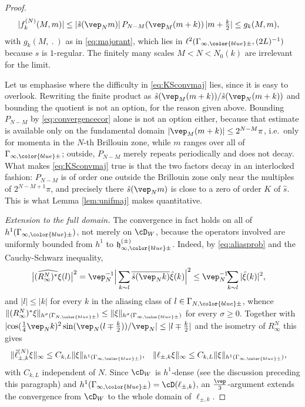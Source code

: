 \documentclass[a4paper, 11pt]{article}
\newcommand{\fh}{\mathfrak{h}}
\newcommand{\ltwo}{\ell^{2}}
\DeclareMathOperator{\1}{\mathds{1}}
\begin{document}
\begin{proof}
\begin{align}
\label{eq:KSconvmaj}
|f^{(N)}_{k}(M,m)| & \leq |\hat{s}(\vep_{N}m)|\!\ P_{N-M}(\vep_{M}(m+k))\!\ |m+\tfrac{k}{2}| \leq g_{k}(M,m),
\end{align}
with $g_{k}(M,\!\ .\!\ )$ as in \eqref{eq:majorant}, which lies in $\ltwo(\Gamma_{\infty,{\color{blue}\pm}},(2L)^{-1})$ because $s$ is $1$-regular. The finitely many scales $M<N<N_{0}(k)$ are irrelevant for the limit.

Let us emphasise where the difficulty in \eqref{eq:KSconvmaj} lies, since it is easy to overlook. Rewriting the finite product as $\hat{s}(\vep_{M}(m+k))/\hat{s}(\vep_{N}(m+k))$ and bounding the quotient is not an option, for the reason given above. Bounding $P_{N-M}$ by \eqref{eq:convergencecor} alone is not an option either, because that estimate is available only on the fundamental domain $|\vep_{M}(m+k)|\leq2^{N-M}\pi$, i.e.~only for momenta in the $N$-th Brillouin zone, while $m$ ranges over all of $\Gamma_{\infty,{\color{blue}\pm}}$; outside, $P_{N-M}$ merely repeats periodically and does not decay. What makes \eqref{eq:KSconvmaj} true is that the two factors decay in an interlocked fashion: $P_{N-M}$ is of order one outside the Brillouin zone only near the multiples of $2^{N-M+1}\pi$, and precisely there $\hat{s}(\vep_{N}m)$ is close to a zero of order $K$ of $\hat{s}$. This is what Lemma \ref{lem:unifmaj} makes quantitative.

\emph{Extension to the full domain.} The convergence in fact holds on all of $h^{1}(\Gamma_{\infty,{\color{blue}\pm}})$, not merely on $\cD_{W}$, because the operators involved are uniformly bounded from $h^{1}$ to $\fh^{(\pm)}_{\infty,{\color{blue}\pm}}$. Indeed, by \eqref{eq:aliasprob} and the Cauchy-Schwarz inequality,
\begin{align}
\label{eq:coisometrysobolev}
\big|\widehat{(R^{N}_{\infty})^{*}\xi}(l)\big|^{2} & = \vep_{N}^{-1}\Big|\sum_{k\sim l}\overline{\hat{s}(\vep_{N}k)}\hat{\xi}(k)\Big|^{2} \leq \vep_{N}^{-1}\!\!\sum_{k\sim l}|\hat{\xi}(k)|^{2},
\end{align}
and $|l|\leq|k|$ for every $k$ in the aliasing class of $l\in\Gamma_{N,{\color{blue}\pm}}$, whence $\|(R^{N}_{\infty})^{*}\xi\|_{h^{\sigma}(\Gamma_{N,{\color{blue}\pm}})}\leq\|\xi\|_{h^{\sigma}(\Gamma_{\infty,{\color{blue}\pm}})}$ for every $\sigma\geq0$. Together with $|\!\cos(\tfrac{1}{4}\vep_{N}k)^{2}\sin(\vep_{N}(l\mp\tfrac{k}{2}))/\vep_{N}|\leq|l\mp\tfrac{k}{2}|$ and the isometry of $R^{N}_{\infty}$ this gives
\begin{align}
\label{eq:unifh1bound}
\|\tilde{\ell}^{(N)}_{\pm,k}\xi\|_{\infty} & \leq C_{k,L}\|\xi\|_{h^{1}(\Gamma_{\infty,{\color{blue}\pm}})}, & \|\ell_{\pm,k}\xi\|_{\infty} & \leq C_{k,L}\|\xi\|_{h^{1}(\Gamma_{\infty,{\color{blue}\pm}})},
\end{align}
with $C_{k,L}$ independent of $N$. Since $\cD_{W}$ is $h^{1}$-dense (see the discussion preceding this paragraph) and $h^{1}(\Gamma_{\infty,{\color{blue}\pm}}) = \cD(\ell_{\pm,k})$, an $\tfrac{\vep}{3}$-argument extends the convergence from $\cD_{W}$ to the whole domain of $\ell_{\pm,k}$.
\end{proof}
\end{document}
